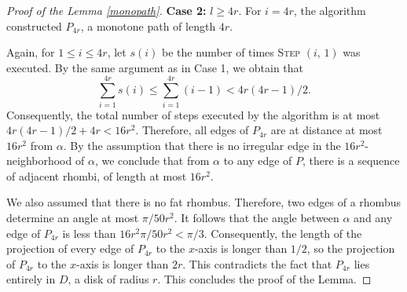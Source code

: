 \documentclass[10pt,a4paper]{amsart}
\begin{document}
\begin{proof}[Proof of the Lemma \ref{monopath}]
\smallskip


\noindent \textbf{Case 2:} $l\ge 4r$. For $i=4r$, the algorithm  constructed $P_{4r}$, a monotone path of length $4r$.

Again, for $1\le i\le 4r$, let $s(i)$ be the number of times \textsc{Step $(i,  \, 1)$} was executed. By the same argument as in Case 1, we obtain that 
$$\sum_{i=1}^{4r}s(i)\le \sum_{i=1}^{4r}(i-1)<4r(4r-1)/2.$$
Consequently, the total number of steps executed by the algorithm is at most $4r(4r-1)/2+4r<16r^2$. Therefore, 
all edges of $P_{4r}$ are at distance at most $16r^2$ from $\alpha$. By the assumption that there is no irregular edge in the 
$16r^2$-neighborhood of $\alpha$, we conclude that from $\alpha$ to any edge of $P$, there is a sequence of adjacent rhombi, of length at most $16r^2$. 

We also assumed that there is no fat rhombus. Therefore, two edges of a rhombus determine an angle at most $\pi/50r^2$. It follows that the angle between $\alpha$ and any edge of $P_{4r}$ is less than $16r^2\pi/50r^2< \pi/3$. Consequently, the length of the projection of every edge of $P_{4r}$ to the $x$-axis is longer than $1/2$, so the projection of $P_{4r}$ to the $x$-axis is longer than $2r$. This contradicts the fact that $P_{4r}$ lies entirely in $D$, a disk of radius $r$. This concludes the proof of the Lemma. \end{proof}
\end{document}
